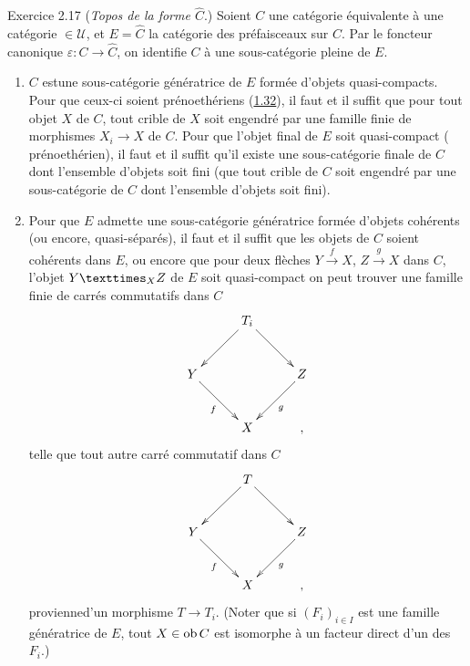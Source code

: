 \documentclass[10pt]{../fichiers-configuration-latex/smfart}
\begin{document}
\begin{enonce*}[remark]{Exercice 2.17}
(\emph{Topos de la forme $\widehat{C}$}.)
Soient $C$ une catégorie équivalente à une catégorie $\in 𝒰$, et $E =
\widehat{C}$ la catégorie des préfaisceaux sur $C$. Par le foncteur
canonique $\varepsilon : C \to \widehat{C}$, on identifie $C$ à une
sous-catégorie pleine de $E$.
\begin{enumerate}
\renewcommand{\theenumi}{\alph {enumi}}
\renewcommand{\labelenumi}{(\theenumi)}
\item $C$ est\pageoriginale une sous-catégorie génératrice de $E$
  formée d'objets  quasi-compacts. Pour que ceux-ci soient prénoethériens (\cf \hyperref[VI.subsec1.32]{1.32}),
  il faut et il suffit que pour tout objet $X$ de $C$, tout crible de
  $X$ soit engendré par une famille finie de morphismes $X_i \to X$ de
  $C$. Pour que l'objet final de $E$ soit quasi-compact (\resp
  prénoethérien), il faut et il suffit qu'il existe une sous-catégorie
  finale de $C$ dont l'ensemble d'objets soit fini (\resp que tout
  crible de $C$ soit engendré par une sous-catégorie de $C$ dont
  l'ensemble d'objets soit fini).

\item Pour que $E$ admette une sous-catégorie génératrice formée
  d'objets cohérents (ou encore, quasi-séparés), il faut et il suffit
  que les objets de $C$ soient cohérents dans $E$, ou encore que pour
  deux flèches $Y \xrightarrow{f} X$,  $Z \xrightarrow{g} X$ dans $C$,
  l'objet $\fprod{Y}{Z}{X}$ de $E$ soit quasi-compact \ie on peut
  trouver une famille finie de carrés commutatifs dans $C$
\[
\xymatrix@=1cm{
 & T_i \ar[ld] \ar[rd]& \\
Y\ar[rd]_{f}&    & Z\ar[ld]^{g}\\
 & X  &,
}
\]
telle que  tout autre carré commutatif dans $C$
\[
\xymatrix@=1cm{
 & T \ar[ld] \ar[rd]& \\
Y\ar[rd]_{f}&    & Z\ar[ld]^{g}\\
 & X  &,
}
\]
provienne\pageoriginale d'un morphisme $T \to T_i$. (Noter que si
$(F_i)_{i \in I}$ est une famille génératrice de $E$, tout $X \in \operatorname{ob} C$ est isomorphe à
un facteur direct d'un des $F_i$.)


\end{enumerate}
\end{enonce*}
\end{document}
